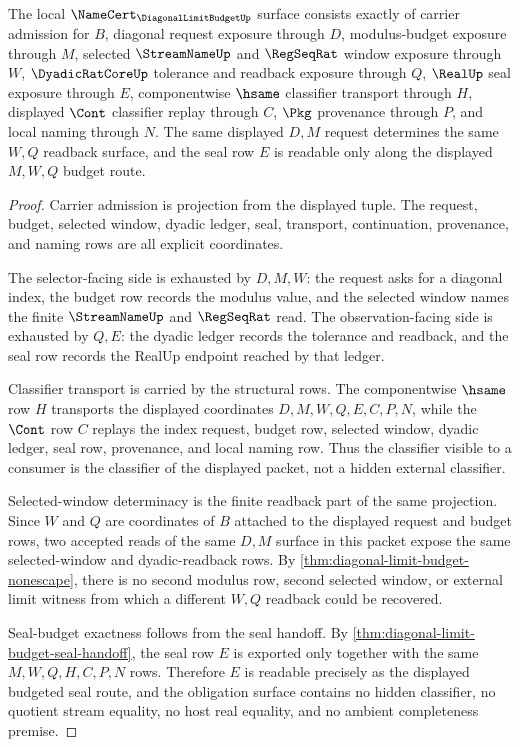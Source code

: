 \begin{theorem}
\label{thm:diagonal-limit-budget-obligation-surface}
The local $\NameCert_{\DiagonalLimitBudgetUp}$ surface consists exactly of carrier admission for $B$, diagonal request exposure through $D$, modulus-budget exposure through $M$, selected $\StreamNameUp$ and $\RegSeqRat$ window exposure through $W$, $\DyadicRatCoreUp$ tolerance and readback exposure through $Q$, $\RealUp$ seal exposure through $E$, componentwise $\hsame$ classifier transport through $H$, displayed $\Cont$ classifier replay through $C$, $\Pkg$ provenance through $P$, and local naming through $N$. The same displayed $D,M$ request determines the same $W,Q$ readback surface, and the seal row $E$ is readable only along the displayed $M,W,Q$ budget route.
\end{theorem}
\begin{proof}
Carrier admission is projection from the displayed tuple. The request, budget, selected window, dyadic ledger, seal, transport, continuation, provenance, and naming rows are all explicit coordinates.

The selector-facing side is exhausted by $D,M,W$: the request asks for a diagonal index, the budget row records the modulus value, and the selected window names the finite $\StreamNameUp$ and $\RegSeqRat$ read. The observation-facing side is exhausted by $Q,E$: the dyadic ledger records the tolerance and readback, and the seal row records the RealUp endpoint reached by that ledger.

Classifier transport is carried by the structural rows. The componentwise $\hsame$ row $H$ transports the displayed coordinates $D,M,W,Q,E,C,P,N$, while the $\Cont$ row $C$ replays the index request, budget row, selected window, dyadic ledger, seal row, provenance, and local naming row. Thus the classifier visible to a consumer is the classifier of the displayed packet, not a hidden external classifier.

Selected-window determinacy is the finite readback part of the same projection. Since $W$ and $Q$ are coordinates of $B$ attached to the displayed request and budget rows, two accepted reads of the same $D,M$ surface in this packet expose the same selected-window and dyadic-readback rows. By \autoref{thm:diagonal-limit-budget-nonescape}, there is no second modulus row, second selected window, or external limit witness from which a different $W,Q$ readback could be recovered.

Seal-budget exactness follows from the seal handoff. By \autoref{thm:diagonal-limit-budget-seal-handoff}, the seal row $E$ is exported only together with the same $M,W,Q,H,C,P,N$ rows. Therefore $E$ is readable precisely as the displayed budgeted seal route, and the obligation surface contains no hidden classifier, no quotient stream equality, no host real equality, and no ambient completeness premise.
\end{proof}

